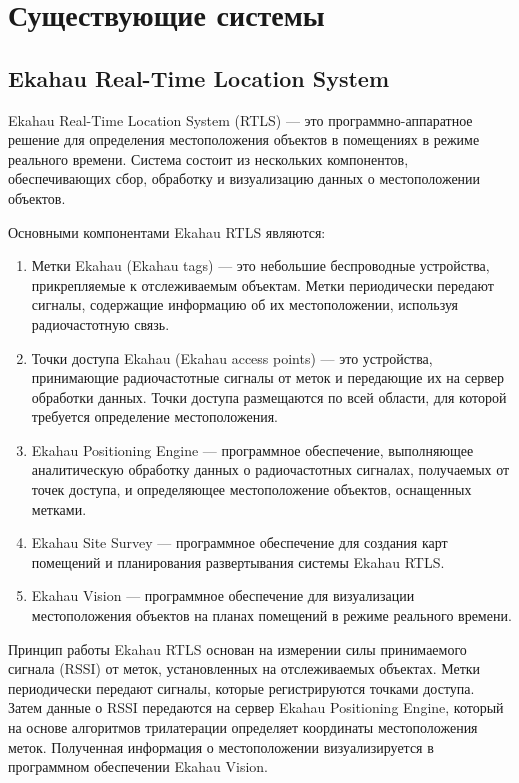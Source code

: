 \section{Существующие системы}

\subsection{Ekahau Real-Time Location System}

Ekahau Real-Time Location System (RTLS) --- это программно-аппаратное решение для определения местоположения объектов в помещениях в режиме реального времени. Система состоит из нескольких компонентов, обеспечивающих сбор, обработку и визуализацию данных о местоположении объектов.

Основными компонентами Ekahau RTLS являются:

\begin{enumerate}
    \item Метки Ekahau (Ekahau tags) --- это небольшие беспроводные устройства, прикрепляемые к отслеживаемым объектам. Метки периодически передают сигналы, содержащие информацию об их местоположении, используя радиочастотную связь.
    \item Точки доступа Ekahau (Ekahau access points) --- это устройства, принимающие радиочастотные сигналы от меток и передающие их на сервер обработки данных. Точки доступа размещаются по всей области, для которой требуется определение местоположения.
    \item Ekahau Positioning Engine --- программное обеспечение, выполняющее аналитическую обработку данных о радиочастотных сигналах, получаемых от точек доступа, и определяющее местоположение объектов, оснащенных метками.
    \item Ekahau Site Survey --- программное обеспечение для создания карт помещений и планирования развертывания системы Ekahau RTLS.
    \item Ekahau Vision --- программное обеспечение для визуализации местоположения объектов на планах помещений в режиме реального времени.
\end{enumerate}

Принцип работы Ekahau RTLS основан на измерении силы принимаемого сигнала (RSSI) от меток, установленных на отслеживаемых объектах. Метки периодически передают сигналы, которые регистрируются точками доступа. Затем данные о RSSI передаются на сервер Ekahau Positioning Engine, который на основе алгоритмов трилатерации определяет координаты местоположения меток. Полученная информация о местоположении визуализируется в программном обеспечении Ekahau Vision.

